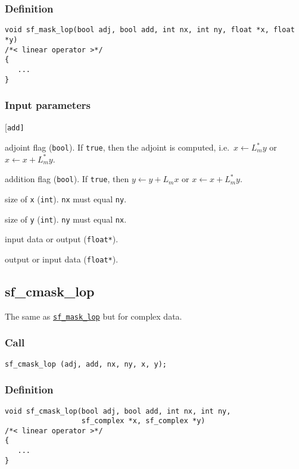 \subsubsection*{Definition}
\begin{verbatim}
void sf_mask_lop(bool adj, bool add, int nx, int ny, float *x, float *y)
/*< linear operator >*/
{
   ...    
}
\end{verbatim}

\subsubsection*{Input parameters}
\begin{desclist}{\tt }{\quad}[\tt add]
   \setlength\itemsep{0pt}
   \item[adj] adjoint flag (\texttt{bool}). If \texttt{true}, then the adjoint is computed, i.e.~$x\leftarrow L_m^*y$ or $x\leftarrow x+L_m^*y$. 
   \item[add] addition flag (\texttt{bool}). If \texttt{true}, then $y\leftarrow y+L_mx$ or $x\leftarrow x+L_m^*y$.  
   \item[nx]  size of \texttt{x} (\texttt{int}). \texttt{nx} must equal \texttt{ny}. 
   \item[ny]  size of \texttt{y} (\texttt{int}). \texttt{ny} must equal \texttt{nx}. 
   \item[x]   input data or output (\texttt{float*}).
   \item[y]   output or input data (\texttt{float*}).
\end{desclist}




\subsection{{sf\_cmask\_lop}}
The same as \hyperref[sec:sf_mask_lop]{\texttt{sf\_mask\_lop}} but for complex data.

\subsubsection*{Call}
\begin{verbatim}sf_cmask_lop (adj, add, nx, ny, x, y);\end{verbatim}

\subsubsection*{Definition}
\begin{verbatim}
void sf_cmask_lop(bool adj, bool add, int nx, int ny, 
                  sf_complex *x, sf_complex *y)
/*< linear operator >*/
{
   ...
}
\end{verbatim}

